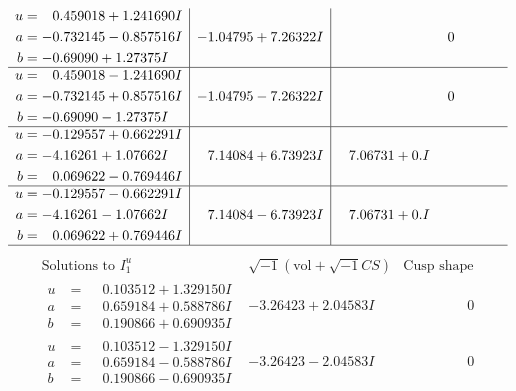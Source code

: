 \documentclass[1p]{elsarticle_modified}
\theoremstyle{definition}
\newcommand{\I}{\sqrt{-1}}
\begin{document}
$$\begin{array}{c|c|c}
\begin{aligned}
u &= \phantom{-}0.459018 + 1.241690 I \\
a &= -0.732145 - 0.857516 I \\
b &= -0.69090 + 1.27375 I\end{aligned}
 & -1.04795 + 7.26322 I & \phantom{-0.000000 } 0 \\ \hline\begin{aligned}
u &= \phantom{-}0.459018 - 1.241690 I \\
a &= -0.732145 + 0.857516 I \\
b &= -0.69090 - 1.27375 I\end{aligned}
 & -1.04795 - 7.26322 I & \phantom{-0.000000 } 0 \\ \hline\begin{aligned}
u &= -0.129557 + 0.662291 I \\
a &= -4.16261 + 1.07662 I \\
b &= \phantom{-}0.069622 - 0.769446 I\end{aligned}
 & \phantom{-}7.14084 + 6.73923 I & \phantom{-}7.06731 + 0. I\phantom{ +0.000000I} \\ \hline\begin{aligned}
u &= -0.129557 - 0.662291 I \\
a &= -4.16261 - 1.07662 I \\
b &= \phantom{-}0.069622 + 0.769446 I\end{aligned}
 & \phantom{-}7.14084 - 6.73923 I & \phantom{-}7.06731 + 0. I\phantom{ +0.000000I}\\
 \hline 
 \end{array}$$\newpage$$\begin{array}{c|c|c}  
\text{Solutions to }I^u_{1}& \I (\text{vol} + \sqrt{-1}CS) & \text{Cusp shape}\\
 \hline 
\begin{aligned}
u &= \phantom{-}0.103512 + 1.329150 I \\
a &= \phantom{-}0.659184 + 0.588786 I \\
b &= \phantom{-}0.190866 + 0.690935 I\end{aligned}
 & -3.26423 + 2.04583 I & \phantom{-0.000000 } 0 \\ \hline\begin{aligned}
u &= \phantom{-}0.103512 - 1.329150 I \\
a &= \phantom{-}0.659184 - 0.588786 I \\
b &= \phantom{-}0.190866 - 0.690935 I\end{aligned}
 & -3.26423 - 2.04583 I & \phantom{-0.000000 } 0 \\ \hline\begin{aligned}

\end{aligned}
\end{array}$$
\end{document}
